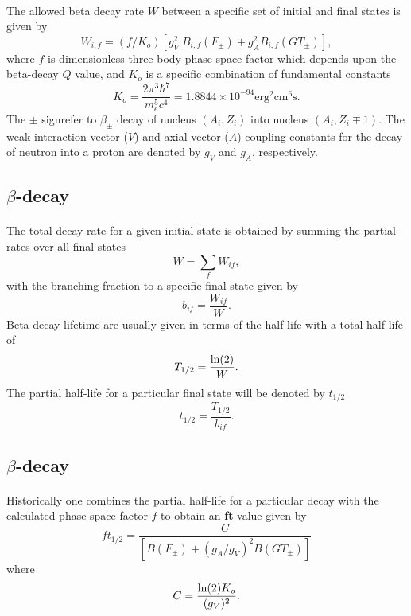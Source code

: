 \documentclass[%
oneside,                 %
final,                   %
10pt]{article}
\begin{document}
\paragraph{}
The allowed beta decay rate $W$ between a specific set of
initial and final states is given by
\[
W_{i,f} = (f/K_{o}) \left[ g_{V}^{2} \; B_{i,f}(F_{\pm})+ g_{A}^{2}B_{i,f}(GT_{\pm})\right], 
\]
where $f$ is dimensionless three-body
phase-space factor which depends upon the
beta-decay $Q$ value,
and $K_{o}$ is a specific combination of fundamental constants
\[
  K_{o}=\frac{2\pi^{3}\hbar^{7}}{ m_{e}^{5} c^{4}}= 1.8844 \times 10^{-94}\mathrm{erg}^{2}\mathrm{cm}^{6}\mathrm{s}. 
\]
The $\pm$ signrefer to $\beta_{\pm}$ decay of nucleus
$(A_{i},Z_{i})$ into nucleus $(A_{i},Z_{i} \mp 1)  $.
The weak-interaction vector ($V$) and axial-vector ($A$) coupling
constants for the decay of neutron into a proton are denoted by $g_{V}$
and $g_{A}$, respectively.



\subsection{$\beta$-decay}

\paragraph{}
The total decay rate for a given
initial state is obtained by summing the partial rates over all
final states
\[
W = \displaystyle\sum _{f} W_{if}, 
\]
with the branching fraction to a specific final state given by
\[
b_{if} = \frac{W_{if}}{W}.  
\]
Beta decay lifetime are usually given in terms of the half-life with
a total half-life of
\[
T_{1/2} = \frac{{\rm ln}(2)}{W}.
\]
The partial half-life for a particular final state will be
denoted by $t_{1/2}$
\[
t_{1/2} = \frac{T_{1/2}}{b_{if}}. 
\]



\subsection{$\beta$-decay}

\paragraph{}
Historically
one combines the partial half-life for a particular decay
with the calculated
phase-space factor $f$ to obtain  an \textbf{ft} value given by
\[
  f t_{1/2}=\frac{C }{\left[B(F_{\pm})+(g_{A}/g_{V})^{2} B(GT_{\pm}) \right] }  
\]
where
\[
  C = \frac{{\rm ln}(2)K_{o}}{(g_{V})^{2}}. 
\]
\end{document}

